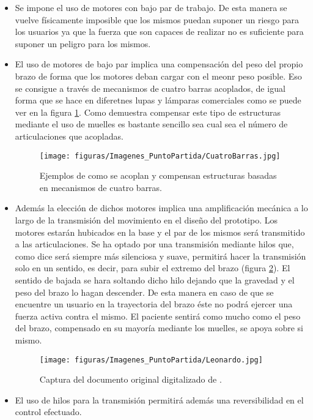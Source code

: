 \begin{itemize}
    \item Se impone el uso de motores con bajo par de trabajo. De esta manera se vuelve físicamente imposible que los mismos puedan suponer un riesgo para los usuarios ya que la fuerza que son capaces de realizar no es suficiente para suponer un peligro para los mismos.
    \item El uso de motores de bajo par implica una compensación del peso del propio brazo de forma que los motores deban cargar con el meonr peso posible. Eso se consigue a través de mecanismos de cuatro barras acoplados, de igual forma que se hace en diferetnes lupas y lámparas comerciales como se puede ver en la figura \ref{fig:PuntoPartida:CuatroBarras}. Como demuestra \cite{Rahman_asimple} compensar este tipo de estructuras mediante el uso de muelles es bastante sencillo sea cual sea el número de articulaciones que acopladas.
    \begin{figure}
    	\centering
    	\texttt{[image: figuras/Imagenes\_PuntoPartida/CuatroBarras.jpg]}
    	\caption{Ejemplos de como se acoplan y compensan estructuras basadas en mecanismos de cuatro barras.}
    	\label{fig:PuntoPartida:CuatroBarras}
    \end{figure}
    \item Además la elección de dichos motores implica una amplificación mecánica a lo largo de la transmisión del movimiento en el diseño del prototipo. Los motores estarán hubicados en la base y el par de los mismos será transmitido a las articulaciones. Se ha optado por una transmisión mediante hilos que, como dice \cite{LeonardoCodice} será siempre más silenciosa y suave, permitirá hacer la transmisión solo en un sentido, es decir, para subir el extremo del brazo (figura \ref{fig:PuntoPartida:leonardo}). El sentido de bajada se hara soltando dicho hilo dejando que la gravedad y el peso del brazo lo hagan descender. De esta manera en caso de que se encuentre un usuario en la trayectoria del brazo éste no podrá ejercer una fuerza activa contra el mismo. El paciente sentirá como mucho como el peso del brazo, compensado en su mayoría mediante los muelles, se apoya sobre si mismo.
    \begin{figure}[H]
    \begin{adjustwidth}{-1.9cm}{-1.5cm}
           \centering
           \texttt{[image: figuras/Imagenes\_PuntoPartida/Leonardo.jpg]}
           \caption{Captura del documento original digitalizado de \cite{LeonardoCodice}.}
           \label{fig:PuntoPartida:leonardo}
       \end{adjustwidth}
    \end{figure}
    \item El uso de hilos para la transmisión permitirá además una reversibilidad en el control efectuado.
\end{itemize}

